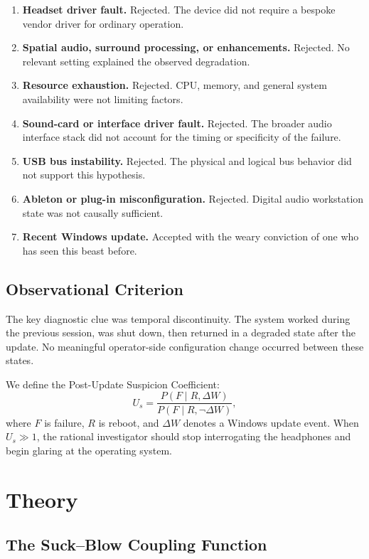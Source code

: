 \documentclass[10pt,twocolumn]{article}
\begin{document}
\begin{enumerate}
\item \textbf{Headset driver fault.} Rejected. The device did not require a bespoke vendor driver for ordinary operation.
\item \textbf{Spatial audio, surround processing, or enhancements.} Rejected. No relevant setting explained the observed degradation.
\item \textbf{Resource exhaustion.} Rejected. CPU, memory, and general system availability were not limiting factors.
\item \textbf{Sound-card or interface driver fault.} Rejected. The broader audio interface stack did not account for the timing or specificity of the failure.
\item \textbf{USB bus instability.} Rejected. The physical and logical bus behavior did not support this hypothesis.
\item \textbf{Ableton or plug-in misconfiguration.} Rejected. Digital audio workstation state was not causally sufficient.
\item \textbf{Recent Windows update.} Accepted with the weary conviction of one who has seen this beast before.
\end{enumerate}

\subsection{Observational Criterion}

The key diagnostic clue was temporal discontinuity. The system worked during the previous session, was shut down, then returned in a degraded state after the update. No meaningful operator-side configuration change occurred between these states.

We define the Post-Update Suspicion Coefficient:
\begin{equation}
U_s = \frac{P(F \mid R, \Delta W)}{P(F \mid R, \neg \Delta W)},
\label{eq:update_suspicion}
\end{equation}
where $F$ is failure, $R$ is reboot, and $\Delta W$ denotes a Windows update event. When $U_s \gg 1$, the rational investigator should stop interrogating the headphones and begin glaring at the operating system.

\section{Theory}

\subsection{The Suck--Blow Coupling Function}
\end{document}
